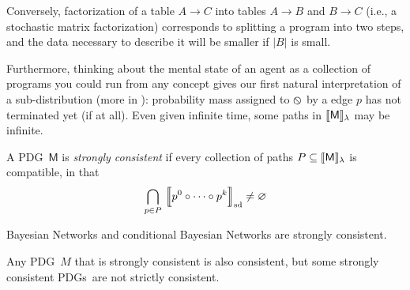 \documentclass{article}
\newcommand\SD{_{\text{sd}}}
\newcommand{\none}{\varobslash}
\newcommand{\sfM}{\mathsf M}
\newcommand{\MN}{PDG}
\newcommand{\MNs}{\MN s}
\numberwithin{equation}{section}
\begin{document}
\begin{vfull}
\begin{example}
		Conversely, factorization of a table $A \to C$ into tables $A \to B$ and $B \to C$ (i.e., a stochastic matrix factorization) corresponds to splitting a program into two steps, and the data necessary to describe it will be smaller if $|B|$ is small.
	\end{example}	
	
	
	Furthermore, thinking about the mental state of an agent as a collection of programs you could run from any concept gives our first natural interpretation of a sub-distribution (more in ): probability mass assigned to $\none$ by a edge $p$ has not terminated yet (if at all). 
	Even given infinite time, some paths in $\bbr{\sfM}_\lambda$ may be infinite.
	
	\begin{defn}
		A \MN\ $\sfM$ is \emph{strongly consistent} if every collection of paths $P \subseteq \bbr{\sfM}_\lambda$ is compatible, in that 
		$$\bigcap_{p \in P}\ \bbr*{\vphantom{\Big|}p^0\circ \cdots\circ p^k}\SD \neq \varnothing$$
	\end{defn}

	\begin{example}
		Bayesian Networks and conditional Bayesian Networks are strongly consistent.
	\end{example}

	\begin{prop}
		Any \MN\ $M$ that is strongly consistent is also consistent, but some strongly consistent \MNs\ are not strictly consistent.
	\end{prop}




	\end{vfull}
\end{document}
